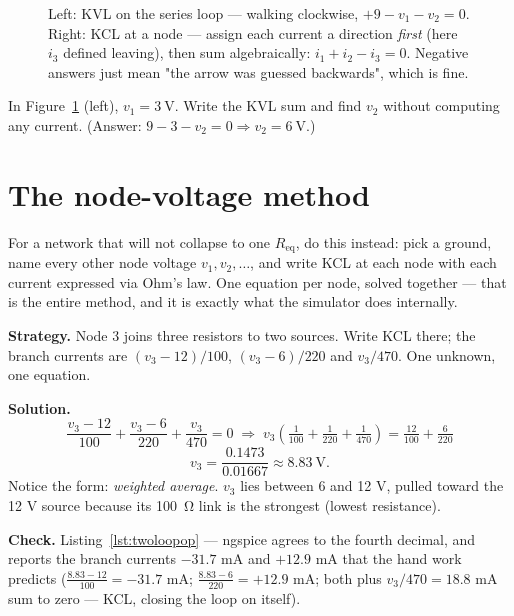 \begin{figure}[htbp]
\centering

\caption{Left: KVL on the series loop — walking clockwise,
$+9 - v_1 - v_2 = 0$. Right: KCL at a node — assign each current a direction
\emph{first} (here $i_3$ defined leaving), then sum algebraically:
$i_1 + i_2 - i_3 = 0$. Negative answers just mean "the arrow was guessed
backwards", which is fine.}
\label{fig:kvlkcl}
\end{figure}

\begin{checkpoint}
In Figure~\ref{fig:kvlkcl} (left), $v_1=\qty{3}{\volt}$. Write the KVL sum
and find $v_2$ without computing any current. (Answer:
$9-3-v_2=0 \Rightarrow v_2=\qty{6}{\volt}$.)
\end{checkpoint}

\section{The node-voltage method}
\label{sec:nodevoltage}

For a network that will not collapse to one $R_{\mathrm{eq}}$, do this
instead: pick a ground, name every other node
voltage $v_1, v_2, \dots$, and write KCL at each node with each current
expressed via Ohm's law. One equation per node, solved together — that is the
entire method, and it is exactly what the simulator does internally.

\begin{example}
\label{ex:twoloop}
\textbf{Strategy.} Node 3 joins three resistors to two sources. Write KCL
there; the branch currents are $(v_3 - 12)/100$, $(v_3 - 6)/220$ and
$v_3/470$. One unknown, one equation.

\textbf{Solution.}
\[
\frac{v_3-12}{100} + \frac{v_3-6}{220} + \frac{v_3}{470} = 0
\;\Longrightarrow\;
v_3\!\left(\tfrac{1}{100}+\tfrac{1}{220}+\tfrac{1}{470}\right)
= \tfrac{12}{100}+\tfrac{6}{220}
\]
\[
v_3 = \frac{0.1473}{0.01667} \approx \qty{8.83}{\volt}.
\]
Notice the form: \emph{weighted average}. $v_3$ lies between 6 and 12 V,
pulled toward the 12 V source because its \qty{100}{\ohm} link is the
strongest (lowest resistance).

\textbf{Check.} Listing~\ref{lst:twoloopop} — ngspice agrees to the fourth
decimal, and reports the branch currents $-31.7$ mA and $+12.9$ mA that the
hand work predicts ($\frac{8.83-12}{100}=-31.7$ mA;
$\frac{8.83-6}{220}=+12.9$ mA; both plus $v_3/470=18.8$ mA sum to zero —
KCL, closing the loop on itself).
\end{example}

